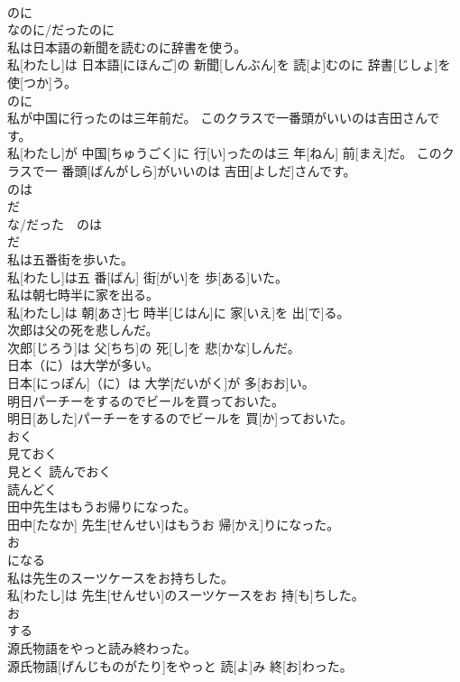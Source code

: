 \documentclass[8pt]{extreport}
\begin{document}
\begin{CJK}{UTF8}{min}
\\	のに 
\\	なのに/だったのに	
\\	私は日本語の新聞を読むのに辞書を使う。	
\\	私[わたし]は 日本語[にほんご]の 新聞[しんぶん]を 読[よ]むのに 辞書[じしょ]を 使[つか]う。	
\\	のに	
\\	私が中国に行ったのは三年前だ。 このクラスで一番頭がいいのは吉田さんです。	
\\	私[わたし]が 中国[ちゅうごく]に 行[い]ったのは三 年[ねん] 前[まえ]だ。 このクラスで一 番頭[ばんがしら]がいいのは 吉田[よしだ]さんです。	
\\	のは 
\\	だ 
\\	な/だった　のは 
\\	だ	
\\	私は五番街を歩いた。	
\\	私[わたし]は五 番[ばん] 街[がい]を 歩[ある]いた。	
\\	私は朝七時半に家を出る。	
\\	私[わたし]は 朝[あさ]七 時半[じはん]に 家[いえ]を 出[で]る。	
\\	次郎は父の死を悲しんだ。	
\\	次郎[じろう]は 父[ちち]の 死[し]を 悲[かな]しんだ。	
\\	日本（に）は大学が多い。	
\\	日本[にっぽん]（に）は 大学[だいがく]が 多[おお]い。	
\\	明日パーチーをするのでビールを買っておいた。	
\\	明日[あした]パーチーをするのでビールを 買[か]っておいた。	
\\	おく	
\\	見ておく 
\\	見とく 読んでおく 
\\	読んどく
\\	田中先生はもうお帰りになった。	
\\	田中[たなか] 先生[せんせい]はもうお 帰[かえ]りになった。	
\\	お　
\\	になる	
\\	私は先生のスーツケースをお持ちした。	
\\	私[わたし]は 先生[せんせい]のスーツケースをお 持[も]ちした。	
\\	お
\\	する	
\\	源氏物語をやっと読み終わった。	
\\	源氏物語[げんじものがたり]をやっと 読[よ]み 終[お]わった。	

\end{CJK}
\end{document}

